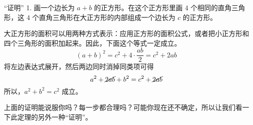\begin{proofs}{“证明” 1.}
    画一个边长为 $a+b$ 的正方形。在这个正方形里画 $4$ 个相同的直角三角形，这 $4$ 个直角三角形在大正方形的内部组成一个边长为 $c$ 的正方形。

    \begin{center}
    \end{center}

    大正方形的面积可以用两种方式表示：应用正方形的面积公式，或者把小正方形和四个三角形的面积加起来。因此，下面这个等式一定成立。
    \[(a+b)^2=c^2+4\cdot\frac{ab}{2}=c^2+2ab\] 
    将左边表达式展开，然后两边同时消掉同类项可得 
    \[a^2+\cancel{2ab}+b^2=c^2+\cancel{2ab}\] 
    所以，$a^2+b^2=c^2$ 成立。
\end{proofs}

上面的证明能说服你吗？每一步都合理吗？可能你现在还不确定，所以让我们看一下此定理的另外一种“证明”。


